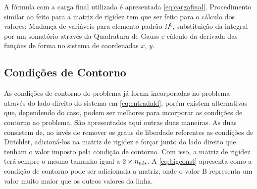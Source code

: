 A fórmula com a carga final utilizada é apresentada \eqref{eq:cargafinal}. Procedimento similar ao feito para a matriz de rigidez tem que ser feito para o cálculo dos valores: Mudança de variáveis para elemento padrão $\Omega^\xi$, substituição da integral por um somatório através da Quadratura de Gauss e cálculo da derivada das funções de forma no sistema de coordenadas $x$, $y$.


\subsection{Condições de Contorno}

As condições de contorno do problema já foram incorporadas no problema através do lado direito do sistema em \eqref{eq:entradald}, porém existem alternativas que, dependendo do caso, podem ser melhores para incorporar as condições de contorno ao problema. São apresentados aqui outras duas maneiras. As duas consistem de, ao invés de remover os graus de liberdade referentes as condições de Dirichlet,  adicioná-los na matriz de rigidez e forçar junto do lado direito que tenham o valor imposto pela condição de contorno. Com isso, a matriz de rigidez terá sempre o mesmo tamanho igual a $2\times \qtdnos$. A  \eqref{eq:bigconst} apresenta como a condição de contorno pode ser adicionada a matriz, onde o valor B representa um valor muito maior que os outros valores da linha.

